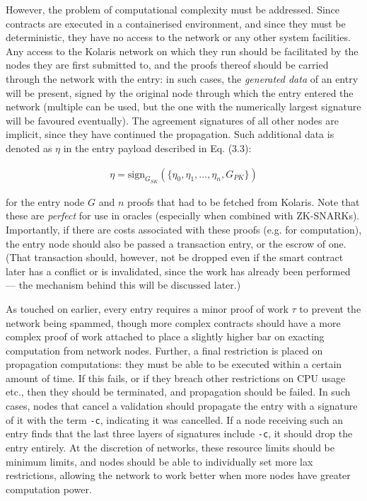\documentclass{extreport}
\begin{document}
However, the problem of computational complexity must be addressed. Since contracts are executed in a containerised environment, and since they must be deterministic, they have no access to the network or any other system facilities. Any access to the Kolaris network on which they run should be facilitated by the nodes they are first submitted to, and the proofs thereof should be carried through the network with the entry: in such cases, the \emph{generated data} of an entry will be present, signed by the original node through which the entry entered the network (multiple can be used, but the one with the numerically largest signature will be favoured eventually). The agreement signatures of all other nodes are implicit, since they have continued the propagation. Such additional data is denoted as \(\eta\) in the entry payload described in Eq. (3.3):

\begin{align*}
\eta = \mathrm{sign}_{G_{SK}}(\{ \eta_0, \eta_1, \ldots, \eta_n, G_{PK} \}) \tag{8.1}
\end{align*}

for the entry node \(G\) and \(n\) proofs that had to be fetched from Kolaris. Note that these are \emph{perfect} for use in oracles (especially when combined with ZK-SNARKs). Importantly, if there are costs associated with these proofs (e.g. for computation), the entry node should also be passed a transaction entry, or the escrow of one. (That transaction should, however, not be dropped even if the smart contract later has a conflict or is invalidated, since the work has already been performed --- the mechanism behind this will be discussed later.)

As touched on earlier, every entry requires a minor proof of work \(\tau\) to prevent the network being spammed, though more complex contracts should have a more complex proof of work attached to place a slightly higher bar on exacting computation from network nodes. Further, a final restriction is placed on propagation computations: they must be able to be executed within a certain amount of time. If this fails, or if they breach other restrictions on CPU usage etc., then they should be terminated, and propagation should be failed. In such cases, nodes that cancel a validation should propagate the entry with a signature of it with the term \texttt{-c}, indicating it was cancelled. If a node receiving such an entry finds that the last three layers of signatures include \texttt{-c}, it should drop the entry entirely. At the discretion of networks, these resource limits should be minimum limits, and nodes should be able to individually set more lax restrictions, allowing the network to work better when more nodes have greater computation power.
\end{document}
